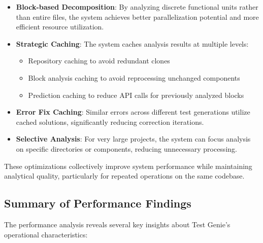 \begin{itemize}
    \item \textbf{Block-based Decomposition}: By analyzing discrete functional units rather than entire files, the system achieves better parallelization potential and more efficient resource utilization.
    
    \item \textbf{Strategic Caching}: The system caches analysis results at multiple levels:
    \begin{itemize}
        \item Repository caching to avoid redundant clones
        \item Block analysis caching to avoid reprocessing unchanged components
        \item Prediction caching to reduce API calls for previously analyzed blocks
    \end{itemize}
    
    \item \textbf{Error Fix Caching}: Similar errors across different test generations utilize cached solutions, significantly reducing correction iterations.
    
    \item \textbf{Selective Analysis}: For very large projects, the system can focus analysis on specific directories or components, reducing unnecessary processing.
\end{itemize}

These optimizations collectively improve system performance while maintaining analytical quality, particularly for repeated operations on the same codebase.

\subsection{Summary of Performance Findings}

The performance analysis reveals several key insights about Test Genie's operational characteristics:

